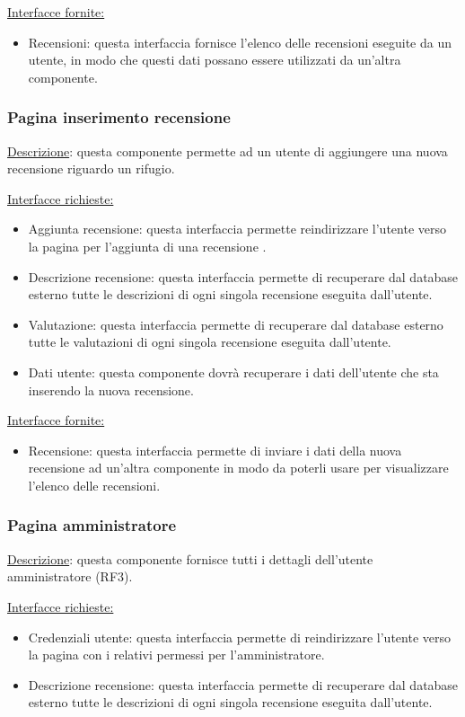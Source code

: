 \documentclass[a4paper,12pt]{article}
\begin{document}
\underline{Interfacce fornite:}
\begin{itemize}
\item Recensioni: questa interfaccia fornisce l'elenco delle recensioni eseguite da un utente, in modo che questi dati possano essere utilizzati da un'altra componente.
\end{itemize}



\subsubsection{Pagina inserimento recensione}
\underline{Descrizione}: questa componente permette ad un utente di aggiungere una nuova recensione riguardo un rifugio.

\underline{Interfacce richieste:}
\begin{itemize}
\item Aggiunta recensione: questa interfaccia permette reindirizzare l'utente verso la pagina per l'aggiunta di una recensione .
\item Descrizione recensione: questa interfaccia permette di recuperare dal database esterno tutte le descrizioni  di ogni singola recensione eseguita dall'utente.
\item Valutazione: questa interfaccia permette di recuperare dal database esterno tutte le valutazioni di ogni singola recensione eseguita dall'utente.
\item Dati utente: questa componente dovrà recuperare i dati dell'utente che sta inserendo la nuova recensione.
\end{itemize}

\underline{Interfacce fornite:}
\begin{itemize}
\item Recensione: questa interfaccia permette di inviare i dati della nuova recensione ad un'altra componente in modo da poterli usare per visualizzare l'elenco delle recensioni.
\end{itemize}



\subsubsection{Pagina amministratore}
\underline{Descrizione}: questa componente fornisce tutti i dettagli dell'utente amministratore (RF3).

\underline{Interfacce richieste:}
\begin{itemize}
\item Credenziali utente: questa interfaccia permette di reindirizzare l'utente verso la pagina con i relativi permessi per l'amministratore.
\item Descrizione recensione: questa interfaccia permette di recuperare dal database esterno tutte le descrizioni  di ogni singola recensione eseguita dall'utente.
\end{itemize}
\end{document}

